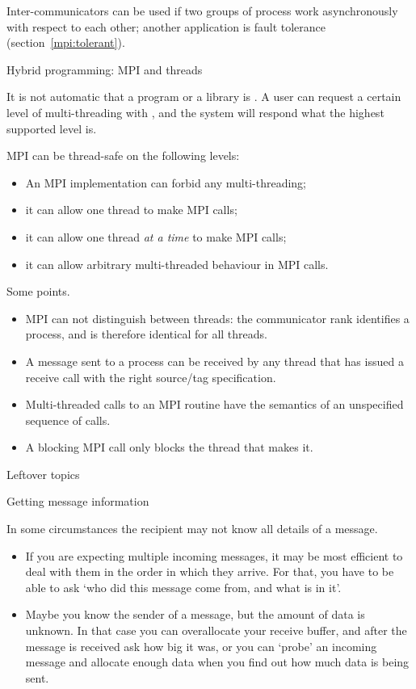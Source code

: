 Inter-communicators can be used if two groups of process work
asynchronously with respect to each other; another application is
fault tolerance (section~\ref{mpi:tolerant}).


 {Hybrid programming: MPI and threads}\

It is not automatic that a program or a library is
.  A user can request a certain level of
multi-threading with , and the system
will respond what the highest supported level is.

MPI can be thread-safe on the following levels:
\begin{itemize}
\item An MPI implementation can forbid any multi-threading;
\item it can allow one thread to make MPI calls;
\item it can allow one thread \emph{at a time} to make MPI calls;
\item it can allow arbitrary multi-threaded behaviour in MPI calls.
\end{itemize}

Some points.
\begin{itemize}
\item MPI can not distinguish between threads: the communicator rank
  identifies a process, and is therefore identical for all threads.
\item A message sent to a process can be received by any thread that
  has issued a receive call with the right source/tag specification.
\item Multi-threaded calls to an MPI routine have the semantics of an
  unspecified sequence of calls.
\item A blocking MPI call only blocks the thread that makes it.
\end{itemize}

 {Leftover topics}

 {Getting message information}

In some circumstances the recipient may not know all details of a message.
\begin{itemize}
\item If you are expecting multiple incoming messages, it may be most
  efficient to deal with them in the order in which they arrive. For
  that, you have to be able to ask `who did this message come from,
  and what is in it'.
\item Maybe you know the sender of a message, but the amount of data
  is unknown. In that case you can overallocate your receive buffer,
  and after the message is received ask how big it was, or you can
  `probe' an incoming message and allocate enough data when you find
  out how much data is being sent.
\end{itemize}

